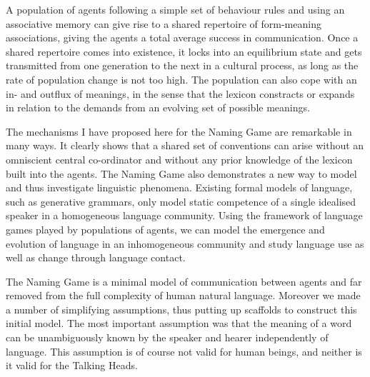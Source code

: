 A population of agents following a simple set of 
behaviour rules and using an associative memory
can give rise to a shared repertoire of form-meaning 
associations, giving the agents a total average success in 
communication. Once a shared repertoire comes
into existence, it locks into an equilibrium state and 
gets transmitted from one generation to the next in a 
cultural process, as long as the rate of population change 
is not too high. The population can also cope with 
an in- and outflux of meanings, in the sense that 
the lexicon constracts or expands in relation to the 
demands from an evolving set of possible meanings.  

The mechanisms I have proposed here for the Naming Game are
remarkable in many ways. It clearly shows that a
shared set of conventions
can arise without an omniscient central co-ordinator and
without any prior knowledge of the lexicon built into 
the agents. The Naming Game also demonstrates
a new way to model and thus
investigate linguistic phenomena. Existing formal models
of language, such as generative grammars, only model static
competence of a single idealised speaker in a homogeneous language
community. Using the framework of language games 
played by populations of agents, we can model the 
emergence and evolution of language in an inhomogeneous community
and study language use as well as change 
through language contact. 

The Naming Game is a minimal model of communication 
between agents and far removed from the full complexity 
of human natural language. Moreover we made a number of 
simplifying assumptions, thus putting up scaffolds to
construct this initial model. The most important assumption
was that the meaning of a word can be unambiguously 
known by the speaker and hearer independently of language. 
This assumption is of course not valid for human 
beings, and neither is it valid for the Talking Heads. 




